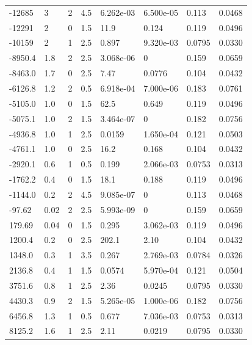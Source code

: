 \documentclass[preview]{standalone}
\begin{document}
{{\begin{tabular}{L{1.2cm}C{1.2cm} C{0.3cm}C{0.5cm} C{1.4cm}C{1.4cm} C{1.4cm}C{1.4cm}}
  -12685  &     3  & 2     & 4.5 &  6.262e-03  & 6.500e-05  & 0.113 &  0.0468   \\ 
  -12291  &     2  & 0     & 1.5 &  11.9  & 0.124  & 0.119 &  0.0496   \\ 
  -10159  &     2  & 1     & 2.5 &  0.897  & 9.320e-03  & 0.0795 &  0.0330   \\ 
  -8950.4  &   1.8  & 2     & 2.5 &  3.068e-06  & 0  & 0.159 &  0.0659   \\ 
  -8463.0  &   1.7  & 0     & 2.5 &  7.47  & 0.0776  & 0.104 &  0.0432   \\ 
  -6126.8  &   1.2  & 2     & 0.5 &  6.918e-04  & 7.000e-06  & 0.183 &  0.0761   \\ 
  -5105.0  &   1.0  & 0     & 1.5 &  62.5  & 0.649  & 0.119 &  0.0496   \\ 
  -5075.1  &   1.0  & 2     & 1.5 &  3.464e-07  & 0  & 0.182 &  0.0756   \\ 
  -4936.8  &   1.0  & 1     & 2.5 &  0.0159  & 1.650e-04  & 0.121 &  0.0503   \\ 
  -4761.1  &   1.0  & 0     & 2.5 &  16.2  & 0.168  & 0.104 &  0.0432   \\ 
  -2920.1  &   0.6  & 1     & 0.5 &  0.199  & 2.066e-03  & 0.0753 &  0.0313   \\ 
  -1762.2  &   0.4  & 0     & 1.5 &  18.1  & 0.188  & 0.119 &  0.0496   \\ 
  -1144.0  &   0.2  & 2     & 4.5 &  9.085e-07  & 0  & 0.113 &  0.0468   \\ 
  -97.62  &  0.02  & 2     & 2.5 &  5.993e-09  & 0  & 0.159 &  0.0659   \\ 
  179.69  &  0.04  & 0     & 1.5 &  0.295  & 3.062e-03  & 0.119 &  0.0496   \\ 
  1200.4  &   0.2  & 0     & 2.5 &  202.1  & 2.10  & 0.104 &  0.0432   \\ 
  1348.0  &   0.3  & 1     & 3.5 &  0.267  & 2.769e-03  & 0.0784 &  0.0326   \\ 
  2136.8  &   0.4  & 1     & 1.5 &  0.0574  & 5.970e-04  & 0.121 &  0.0504   \\ 
  3751.6  &   0.8  & 1     & 2.5 &  2.36  & 0.0245  & 0.0795 &  0.0330   \\ 
  4430.3  &   0.9  & 2     & 1.5 &  5.265e-05  & 1.000e-06  & 0.182 &  0.0756   \\ 
  6456.8  &   1.3  & 1     & 0.5 &  0.677  & 7.036e-03  & 0.0753 &  0.0313   \\ 
  8125.2  &   1.6  & 1     & 2.5 &  2.11  & 0.0219  & 0.0795 &  0.0330   \\ 

\end{tabular}}}
\end{document}
